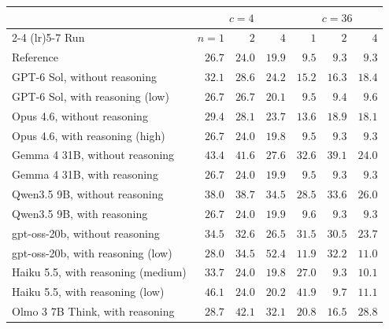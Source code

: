 \begin{tabular}{@{}lrrrrrr@{}}
\toprule
& \multicolumn{3}{c}{$c=4$} & \multicolumn{3}{c}{$c=36$} \\
\cmidrule(lr){2-4} \cmidrule(lr){5-7}
Run & $n=1$ & $2$ & $4$ & $1$ & $2$ & $4$ \\
\midrule
Reference & $26.7$ & $24.0$ & $19.9$ & $9.5$ & $9.3$ & $9.3$ \\
GPT-6 Sol, without reasoning & $32.1$ & $28.6$ & $24.2$ & $15.2$ & $16.3$ & $18.4$ \\
GPT-6 Sol, with reasoning (low) & $26.7$ & $26.7$ & $20.1$ & $9.5$ & $9.4$ & $9.6$ \\
Opus 4.6, without reasoning & $29.4$ & $28.1$ & $23.7$ & $13.6$ & $18.9$ & $18.1$ \\
Opus 4.6, with reasoning (high) & $26.7$ & $24.0$ & $19.8$ & $9.5$ & $9.3$ & $9.3$ \\
Gemma 4 31B, without reasoning & $43.4$ & $41.6$ & $27.6$ & $32.6$ & $39.1$ & $24.0$ \\
Gemma 4 31B, with reasoning & $26.7$ & $24.0$ & $19.9$ & $9.5$ & $9.3$ & $9.3$ \\
Qwen3.5 9B, without reasoning & $38.0$ & $38.7$ & $34.5$ & $28.5$ & $33.6$ & $26.0$ \\
Qwen3.5 9B, with reasoning & $26.7$ & $24.0$ & $19.9$ & $9.6$ & $9.3$ & $9.3$ \\
gpt-oss-20b, without reasoning & $34.5$ & $32.6$ & $26.5$ & $31.5$ & $30.5$ & $23.7$ \\
gpt-oss-20b, with reasoning (low) & $28.0$ & $34.5$ & $52.4$ & $11.9$ & $32.2$ & $11.0$ \\
Haiku 5.5, with reasoning (medium) & $33.7$ & $24.0$ & $19.8$ & $27.0$ & $9.3$ & $10.1$ \\
Haiku 5.5, with reasoning (low) & $46.1$ & $24.0$ & $20.2$ & $41.9$ & $9.7$ & $11.1$ \\
Olmo 3 7B Think, with reasoning & $28.7$ & $42.1$ & $32.1$ & $20.8$ & $16.5$ & $28.8$ \\
\bottomrule
\end{tabular}
